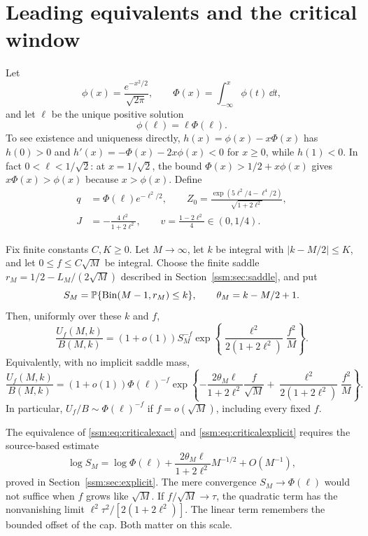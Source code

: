 \section{Leading equivalents and the critical window}\label{ssm:sec:results}
Let
\[
 \phi(x)=\frac{e^{-x^2/2}}{\sqrt{2\pi}},\qquad
 \Phi(x)=\int_{-\infty}^x\phi(t)\,\dd t,
\]
and let $\ell$ be the unique positive solution
\begin{equation}\label{ssm:eq:ell}
 \phi(\ell)=\ell\Phi(\ell).
\end{equation}
To see existence and uniqueness directly, $h(x)=\phi(x)-x\Phi(x)$ has $h(0)>0$ and $h'(x)=-\Phi(x)-2x\phi(x)<0$ for $x\ge0$, while $h(1)<0$. In fact $0<\ell<1/\sqrt2$: at $x=1/\sqrt2$, the bound $\Phi(x)>1/2+x\phi(x)$ gives $x\Phi(x)>\phi(x)$ because $x>\phi(x)$. Define
\begin{equation}\label{ssm:eq:constants}
 \begin{split}
 q&=\Phi(\ell)e^{-\ell^2/2},\qquad
 Z_0=\frac{\exp(5\ell^2/4-\ell^4/2)}{\sqrt{1+2\ell^2}},\\
 J&=-\frac{4\ell^2}{1+2\ell^2},\qquad
 v=\frac{1-2\ell^2}{4}\in(0,1/4).
 \end{split}
\end{equation}

\begin{theorem}\label{ssm:thm:transfer}
Fix finite constants $C,K\ge0$. Let $M\to\infty$, let $k$ be integral with $|k-M/2|\le K$, and let $0\le f\le C\sqrt M$ be integral. Choose the finite saddle $r_M=1/2-L_M/(2\sqrt M)$ described in Section~\ref{ssm:sec:saddle}, and put
\[
 S_M=\mathbb P\{\operatorname{Bin}(M-1,r_M)\le k\},\qquad
 \theta_M=k-M/2+1.
\]
Then, uniformly over these $k$ and $f$,
\begin{equation}\label{ssm:eq:criticalexact}
 \frac{U_f(M,k)}{B(M,k)}
 =(1+o(1))S_M^{-f}
 \exp\left\{\frac{\ell^2}{2(1+2\ell^2)}\frac{f^2}{M}\right\}.
\end{equation}
Equivalently, with no implicit saddle mass,
\begin{equation}\label{ssm:eq:criticalexplicit}
 \frac{U_f(M,k)}{B(M,k)}
 =(1+o(1))\Phi(\ell)^{-f}
 \exp\left\{-\frac{2\theta_M\ell}{1+2\ell^2}\frac f{\sqrt M}
       +\frac{\ell^2}{2(1+2\ell^2)}\frac{f^2}{M}\right\}.
\end{equation}
In particular, $U_f/B\sim\Phi(\ell)^{-f}$ if $f=o(\sqrt M)$, including every fixed $f$.
\end{theorem}

The equivalence of \eqref{ssm:eq:criticalexact} and \eqref{ssm:eq:criticalexplicit} requires the source-based estimate
\begin{equation}\label{ssm:eq:Srateintro}
 \log S_M=\log\Phi(\ell)+\frac{2\theta_M\ell}{1+2\ell^2}M^{-1/2}
 +O(M^{-1}),
\end{equation}
proved in Section~\ref{ssm:sec:explicit}. The mere convergence $S_M\to\Phi(\ell)$ would not suffice when $f$ grows like $\sqrt M$. If $f/\sqrt M\to\tau$, the quadratic term has the nonvanishing limit $\ell^2\tau^2/[2(1+2\ell^2)]$. The linear term remembers the bounded offset of the cap. Both matter on this scale.

